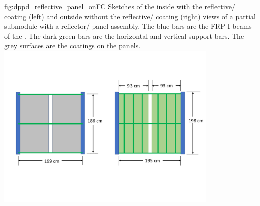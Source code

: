 \begin{dunefigure}{fig:dppd_reflective_panel_onFC}
{Sketches of the inside with the reflective/ coating (left) and outside without the reflective/ coating (right) views of a partial  submodule with a reflector/ panel assembly. The blue bars are the FRP I-beams of the . The dark green bars are the horizontal and vertical support bars. The grey surfaces are the  coatings on the panels.}
\includegraphics[width=0.8\textwidth]{graphics/dppd_reflective_panel_onFC}
\end{dunefigure}